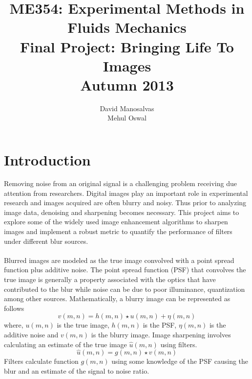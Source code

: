 \documentclass{report}
\title{ME354: Experimental Methods in Fluids Mechanics \\[10pt] \large Final Project: Bringing Life To Images \\ \large{Autumn 2013}}
\author{David Manosalvas \\[2pt] Mehul Oswal}
\date{}
\begin{document}
\maketitle
\pagestyle{fancy}
\tableofcontents
\chapter{Introduction}
Removing noise from an original signal is a challenging problem receiving due attention from researchers. Digital images play an important role in experimental research and images acquired are often blurry and noisy. Thus prior to analyzing image data, denoising and sharpening becomes necessary. This project aims to explore some of the widely used image enhancement algorithms to sharpen images and implement a robust metric to quantify the performance of filters under different blur sources.\\

\\
Blurred images are modeled as the true image convolved with a point spread function plus additive noise. The point spread function (PSF) that convolves the true image is generally a property associated with the optics that have contributed to the blur while noise can be due to poor illuminance, quantization among other sources. Mathematically, a blurry image can be represented as follows\\
\begin{equation}
v(m,n)= h(m,n) \star u(m,n) + \eta(m,n)
\end{equation}
where, $u(m,n)$ is the true image, $h(m,n)$ is the PSF, $\eta(m,n)$ is the additive noise and $v(m,n)$ is the blurry image. Image sharpening involves calculating an estimate of the true image $\hat{u}(m,n)$ using filters.
\begin{equation}
\hat{u}(m,n)= g(m,n) \star v(m,n)
\end{equation}
Filters calculate function $g(m,n)$ using some knowledge of the PSF causing the blur and an estimate of the signal to noise ratio.\\
\end{document}
